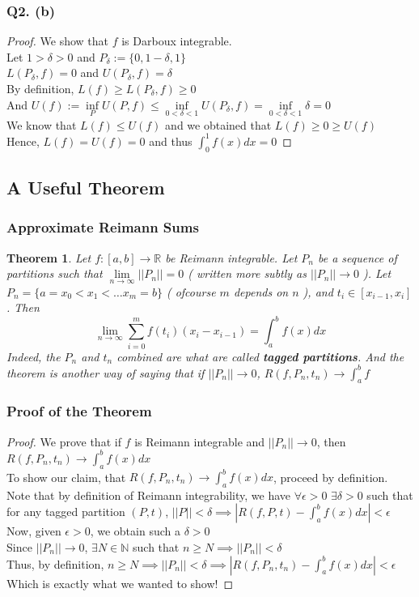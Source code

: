 \documentclass[handout,aspectratio=169]{beamer}
\newtheorem{thm}{Theorem}
\newcommand{\bN}{\mathbb{N}}
\newcommand{\bR}{\mathbb{R}}
\begin{document}
\begin{frame}
\frametitle{Q2. (b)}
\begin{proof}
\pause
We show that $f$ is Darboux integrable. \\ \pause
Let $1>\delta>0$ and $P_\delta := \{0,1-\delta,1\}$ \\ \pause
$L(P_\delta,f) = 0$ and $U(P_\delta,f) = \delta$ \\ \pause
By definition, $L(f) \geqslant L(P_\delta,f) \geqslant 0$ \\ \pause
And $U(f) := \inf\limits_P U(P,f) \leqslant \inf\limits_{0<\delta<1} U(P_\delta,f) = \inf\limits_{0<\delta<1} \delta = 0$\\ \pause
We know that $L(f)\leqslant U(f)$ and we obtained that $L(f)\geqslant 0 \geqslant U(f)$ \\ \pause
Hence, $L(f)=U(f)=0$ and thus $\int_0^1 f(x)dx = 0$
\end{proof}
\end{frame}

\subsection{A Useful Theorem}
\begin{frame}
\frametitle{Approximate Reimann Sums}
\pause
\begin{thm}
Let $f:[a,b]\to \bR$ be Reimann integrable. Let $P_n$ be a sequence of partitions such that $\lim\limits_{n\to\infty}||P_n||=0$ ( written more subtly as $||P_n|| \to 0$ ). Let $P_n = \{a=x_0<x_1<\dots x_m=b\}$ ( ofcourse $m$ depends on $n$ ), and $t_i \in [x_{i-1},x_i]$. Then
$$\lim\limits_{n\to\infty} \sum\limits_{i=0}^m f(t_i)(x_i-x_{i-1}) = \int_a^b f(x)dx$$
Indeed, the $P_n$ and $t_n$ combined are what are called {\bf tagged partitions}. And the theorem is another way of saying that if $||P_n||\to 0$, $R(f,P_n,t_n) \to \int_a^b f$
\end{thm}
\end{frame}

\begin{frame}
\frametitle{Proof of the Theorem}
\begin{proof}
\pause
We prove that if $f$ is Reimann integrable and $||P_n||\to 0$, then $R(f,P_n,t_n)\to \int_a^b f(x)dx$\\ \pause
To show our claim, that $R(f,P_n,t_n) \to \int_a^b f(x)dx$, proceed by definition. \\ \pause
Note that by definition of Reimann integrability, we have $\forall \epsilon>0 \,\,\exists \delta>0$ such that for any tagged partition $(P,t)$, $||P||<\delta \implies |R(f,P,t)-\int_a^b f(x)dx|<\epsilon$\\ \pause
Now, given $\epsilon>0$, we obtain such a $\delta>0$\\ \pause
Since $||P_n|| \to 0$, $\exists N\in \bN$ such that $n\geqslant N \implies ||P_n||<\delta$\\ \pause
Thus, by definition, $n\geqslant N \implies ||P_n||<\delta \implies |R(f,P_n,t_n)-\int_a^b f(x)dx|<\epsilon$ \\ \pause
Which is exactly what we wanted to show!
\end{proof}
\end{frame}
\end{document}

